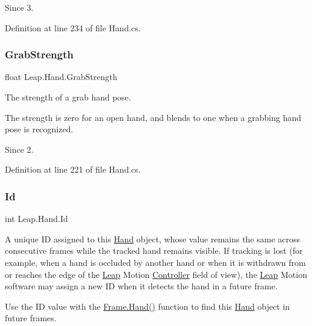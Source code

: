 \begin{DoxySince}{Since}
3. 
\end{DoxySince}


Definition at line 234 of file Hand.\+cs.

\mbox{\label{class_leap_1_1_hand_ae539f15a6d9021cd3161ec869a85d09e}} 
\subsubsection{\texorpdfstring{GrabStrength}{GrabStrength}}
{\footnotesize\ttfamily float Leap.\+Hand.\+Grab\+Strength}



The strength of a grab hand pose. 

The strength is zero for an open hand, and blends to one when a grabbing hand pose is recognized. \begin{DoxySince}{Since}
2. 
\end{DoxySince}


Definition at line 221 of file Hand.\+cs.

\mbox{\label{class_leap_1_1_hand_ac7bfb32524382f4c9e4fb830437fe72b}} 
\subsubsection{\texorpdfstring{Id}{Id}}
{\footnotesize\ttfamily int Leap.\+Hand.\+Id}



A unique ID assigned to this \mbox{\hyperlink{class_leap_1_1_hand}{Hand}} object, whose value remains the same across consecutive frames while the tracked hand remains visible. If tracking is lost (for example, when a hand is occluded by another hand or when it is withdrawn from or reaches the edge of the \mbox{\hyperlink{namespace_leap}{Leap}} Motion \mbox{\hyperlink{class_leap_1_1_controller}{Controller}} field of view), the \mbox{\hyperlink{namespace_leap}{Leap}} Motion software may assign a new ID when it detects the hand in a future frame. 

Use the ID value with the \mbox{\hyperlink{class_leap_1_1_frame_a80b74f329128a4c2630d15bf34d9c234}{Frame.\+Hand()}} function to find this \mbox{\hyperlink{class_leap_1_1_hand}{Hand}} object in future frames.

